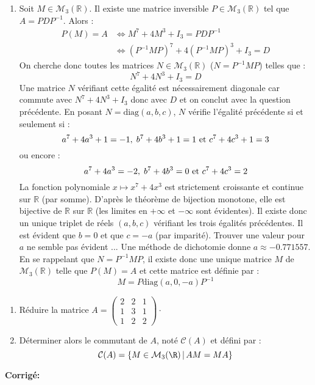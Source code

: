 \documentclass[a4paper,twoside,french,10pt]{VcCours}
\newcommand{\corr}{\textbf{Corrigé:}}
\begin{document}
\begin{enumerate}
\item Soit $M \in \mathcal{M}_3(\mathbb{R})$. Il existe une matrice inversible $P \in \mathcal{M}_3(\mathbb{R})$ tel que $A=PDP^{-1}$. Alors :
\begin{align*}
P(M) =A & \Longleftrightarrow M^7+4M^3 + I_3 = PDP^{-1} \\
& \Longleftrightarrow (P^{-1}MP)^7 + 4(P^{-1}MP)^3+ I_3 = D 
\end{align*}
On cherche donc toutes les matrices $N \in \mathcal{M}_3(\mathbb{R})$ ($N=P^{-1}MP$) telles que :
$$ N^7+4N^3+I_3=D$$
Une matrice $N$ vérifiant cette égalité est nécessairement diagonale car commute avec $N^7+4N^3+I_3$ donc avec $D$ et on conclut avec la question précédente. En posant $N= \textrm{diag}(a,b,c)$, $N$ vérifie l'égalité précédente si et seulement si :
$$ a^7+ 4a^3+1= -1, \; b^7+ 4b^3+1= 1 \hbox{ et } c^7+ 4c^3+1= 3 $$
ou encore :
$$ a^7+ 4a^3= -2, \; b^7+ 4b^3= 0 \hbox{ et } c^7+ 4c^3= 2 $$
La fonction polynomiale $x \mapsto x^7+4x^3$ est strictement croissante et continue sur $\mathbb{R}$ (par somme). D'après le théorème de bijection monotone, elle est bijective de $\mathbb{R}$ sur $\mathbb{R}$ (les limites en $+ \infty$ et $- \infty$ sont évidentes). Il existe donc un unique triplet de réels $(a,b,c)$ vérifiant les trois égalités précédentes. Il est évident que $b=0$ et que $c=-a$ (par imparité). Trouver une valeur pour $a$ ne semble pas évident ... Une méthode de dichotomie donne $a \approx -0.771557$. En se rappelant que $N=P^{-1}MP$, il existe donc une unique matrice $M$ de $\mathcal{M}_3(\mathbb{R})$ telle que $P(M)=A$ et cette matrice est définie par :
$$ M = P \textrm{diag}(a,0,-a) P^{-1}$$
\end{enumerate}

\begin{Exercice}{}
\begin{enumerate}
\item Réduire la matrice $A= \left(\begin{array}{rrr}  2 & 2 & 1\\
1 & 3 & 1\\
1 & 2 & 2 \end{array}\right) \cdot $\\
\item Déterminer alors le commutant de $A$, noté $\mathcal{C}(A)$ et défini par : 
$${\cal C}(A)=\{M\in{\cal M}_3(\R) \, \vert \, AM=MA\}$$
\end{enumerate}
\end{Exercice} 

\corr 
\end{document}
